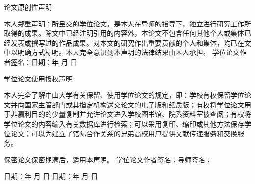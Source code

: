 \begin{center}
    \vspace*{20pt}
    \heiti 论文原创性声明
\end{center}
\fontsize{15}{20}\selectfont

本人郑重声明：所呈交的学位论文，是本人在导师的指导下，独立进行研究工作所取得的成果。除文中已经注明引用的内容外，本论文不包含任何其他个人或集体已经发表或撰写过的作品成果。对本文的研究作出重要贡献的个人和集体，均已在文中以明确方式标明。本人完全意识到本声明的法律结果由本人承担。
\vskip 20pt
\noindent
学位论文作者签名：\qquad\qquad\qquad\qquad\enspace 日期：\qquad 年 \quad 月 \quad 日
\vskip 70pt

\begin{center}
    {\heiti 学位论文使用授权声明}
\end{center}

本人完全了解中山大学有关保留、使用学位论文的规定，即：学校有权保留学位论文并向国家主管部门或其指定机构送交论文的电子版和纸质版；有权将学位论文用于非赢利目的的少量复制并允许论文进入学校图书馆、院系资料室被查阅；有权将学位论文的内容编入有关数据库进行检索；可以采用复印、缩印或其他方法保存学位论文；可以为建立了馆际合作关系的兄弟高校用户提供文献传递服务和交换服务。

保密论文保密期满后，适用本声明。
\vskip 20pt
\noindent
学位论文作者签名：\qquad\qquad\qquad\qquad 导师签名：

\noindent
日期：\qquad 年 \quad 月 \quad 日 \qquad\qquad\qquad\enspace 日期：\qquad 年 \quad 月 \quad 日
\endinput